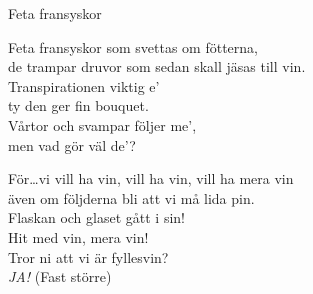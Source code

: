 \begin{song}{Feta fransyskor}
	

	
	Feta fransyskor som svettas om fötterna,\\
	de trampar druvor som sedan skall jäsas till vin.\\
	Transpirationen viktig e’\\
	ty den ger fin bouquet.\\
	Vårtor och svampar följer me’,\\
	men vad gör väl de’?
	
	För\dots vi vill ha vin, vill ha vin, vill ha mera vin\\
	även om följderna bli att vi må lida pin.\\
	Flaskan och glaset gått i sin!\\
	Hit med vin, mera vin!\\
	Tror ni att vi är fyllesvin?\\
	\emph{JA!} (Fast större)
	
\end{song}
